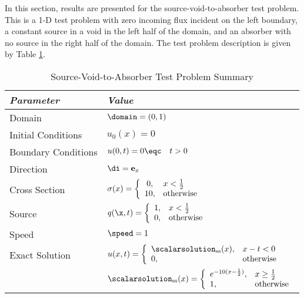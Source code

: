 In this section, results are presented for the source-void-to-absorber test problem. This is a 1-D test problem
with zero incoming flux incident on the left boundary,
a constant source in a void in the left half of the
domain, and an absorber with no source in the right half of the
domain. The test problem description is given by Table
\ref{tab:source_void_to_absorber}.

\begin{table}[htb]\caption{Source-Void-to-Absorber Test Problem Summary}
\label{tab:source_void_to_absorber}
\centering
\begin{tabular}{l l}\toprule
\emph{Parameter} & \emph{Value}\\\midrule
Domain & $\domain = (0,1)$\\
Initial Conditions & $u_0(x)=0$\\
Boundary Conditions & $u(0,t)=0 \eqc \quad t>0$\\
Direction & $\di = \mathbf{e}_x$\\
Cross Section & $\sigma(x)=\left\{\begin{array}{c l}
   0,  & x < \frac{1}{2}\\
   10, & \mbox{otherwise}\end{array}\right.$\\
Source & $q(\x,t)=\left\{\begin{array}{c l}
   1,  & x < \frac{1}{2}\\
   0,  & \mbox{otherwise}\end{array}\right.$\\
Speed & $\speed=1$\\
Exact Solution & $u(x,t)=\left\{\begin{array}{l l}
   \scalarsolution_{\text{ss}}(x), & x-t<0\\
   0, & \mbox{otherwise}
   \end{array}\right.$ \\
   & $\scalarsolution_{\text{ss}}(x) =
       \left\{\begin{array}{l l}
          e^{-10(x-\frac{1}{2})}, & x\ge\frac{1}{2}\\
          1,                      & \mbox{otherwise}
       \end{array}\right.$\\
\bottomrule\end{tabular}
\end{table}

